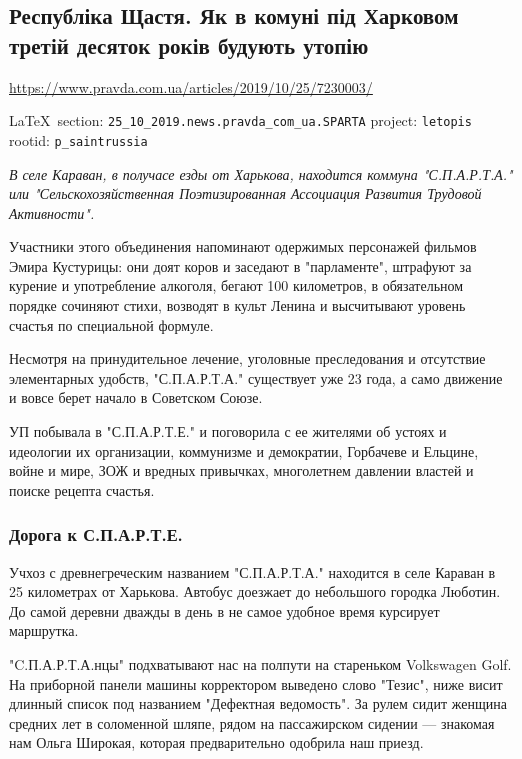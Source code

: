  
 
\subsection{Республіка Щастя. Як в комуні під Харковом третій десяток років будують утопію}
\label{sec:25_10_2019.news.pravda_com_ua.SPARTA}
\url{https://www.pravda.com.ua/articles/2019/10/25/7230003/}
  
\vspace{0.5cm}
 {\ifDEBUG\small\LaTeX~section: \verb|25_10_2019.news.pravda_com_ua.SPARTA| project: \verb|letopis| rootid: \verb|p_saintrussia| \fi}
\vspace{0.5cm}

{\em
В селе Караван, в получасе езды от Харькова, находится коммуна "С.П.А.Р.Т.А."
или "Сельскохозяйственная Поэтизированная Ассоциация Развития Трудовой
Активности". 

Участники этого объединения напоминают одержимых персонажей фильмов Эмира
Кустурицы: они доят коров и заседают в "парламенте", штрафуют за курение и
употребление алкоголя, бегают 100 километров, в обязательном порядке сочиняют
стихи, возводят в культ Ленина и высчитывают уровень счастья по специальной
формуле. 

Несмотря на принудительное лечение, уголовные преследования и отсутствие
элементарных удобств, "С.П.А.Р.Т.А." существует уже 23 года, а само движение и
вовсе берет начало в Советском Союзе.

УП побывала в "С.П.А.Р.Т.Е." и поговорила с ее жителями об устоях и идеологии
их организации, коммунизме и демократии, Горбачеве и Ельцине, войне и мире, ЗОЖ
и вредных привычках, многолетнем давлении властей и поиске рецепта счастья.
}

\subsubsection{Дорога к С.П.А.Р.Т.Е.}

Учхоз с древнегреческим названием "С.П.А.Р.Т.А." находится в селе Караван в 25
километрах от Харькова. Автобус доезжает до небольшого городка Люботин. До
самой деревни дважды в день в не самое удобное время курсирует маршрутка.

"C.П.А.Р.Т.А.нцы" подхватывают нас на полпути на стареньком Volkswagen Golf. На
приборной панели машины корректором выведено слово "Тезис", ниже висит длинный
список под названием "Дефектная ведомость". За рулем сидит женщина средних лет
в соломенной шляпе, рядом на пассажирском сидении --- знакомая нам Ольга Широкая,
которая предварительно одобрила наш приезд.

